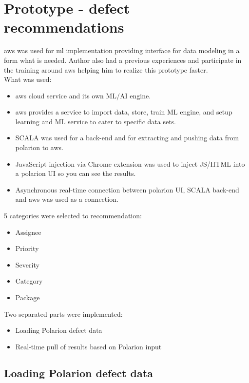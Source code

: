 \documentclass[thesis=M,english]{FITthesis}[2012/06/26]
\begin{document}
\pagebreak
\clearpage
\section{Prototype - defect recommendations}\label{prototype_defect_rec}

\acrshort{aws} was used for \acrfull{ml} implementation providing interface for data modeling in a form what is needed. Author also had a previous experiences and participate in the training around \acrfull{aws} helping him to realize this prototype faster. \\

What was used:
\begin{itemize}[nosep]
\item \acrshort{aws} cloud service and its own ML/AI engine.
\item \acrshort{aws} provides a service to import data, store, train ML engine, and setup learning and ML service to cater to specific data sets. 
\item SCALA was used for a back-end and for extracting and pushing data from \acrshort{polarion} to \acrshort{aws}.
\item JavaScript injection via Chrome extension was used to inject JS/HTML into a \acrshort{polarion} UI so you can see the results.
\item Asynchronous real-time connection between \acrshort{polarion} UI, SCALA back-end and \acrshort{aws} was used as a connection.\\
\end{itemize}

5 categories were selected to recommendation:
\begin{itemize}[nosep]
	\item Assignee
	\item Priority
	\item Severity
	\item Category
	\item Package\\
\end{itemize}

Two separated parts were implemented:
\begin{itemize}[nosep]
	\item Loading Polarion defect data
	\item Real-time pull of results based on Polarion input\\
\end{itemize}

\subsection{Loading Polarion defect data}
\end{document}
